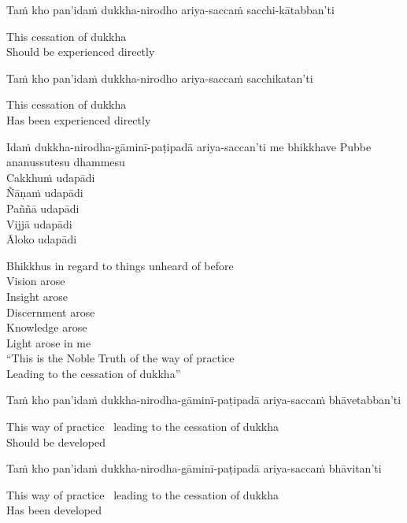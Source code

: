 Taṁ kho pan’idaṁ dukkha-nirodho ariya-saccaṁ sacchi-kātabban’ti

\begin{english}
  This cessation of dukkha\\
  Should be experienced directly
\end{english}

Taṁ kho pan’idaṁ dukkha-nirodho ariya-saccaṁ sacchikatan’ti

\begin{english}
  This cessation of dukkha\\
  Has been experienced directly
\end{english}

Idaṁ dukkha-nirodha-gāminī-paṭipadā ariya-saccan’ti me bhikkhave
Pubbe ananussutesu dhammesu\\
Cakkhuṁ udapādi\\
Ñāṇaṁ udapādi\\
Paññā udapādi\\
Vijjā udapādi\\
Āloko udapādi

\begin{english}
  Bhikkhus in regard to things unheard of before\\
  Vision arose\\
  Insight arose\\
  Discernment arose\\
  Knowledge arose\\
  Light arose in me\\
  “This is the Noble Truth of the way of practice\\
  Leading to the cessation of dukkha”
\end{english}

Taṁ kho pan’idaṁ dukkha-nirodha-gāminī-paṭipadā ariya-saccaṁ bhāvetabban’ti

\begin{english}
  This way of practice \breathmark\ leading to the cessation of dukkha\\
  Should be developed
\end{english}

Taṁ kho pan’idaṁ dukkha-nirodha-gāminī-paṭipadā ariya-saccaṁ bhāvitan’ti

\begin{english}
  This way of practice \breathmark\ leading to the cessation of dukkha\\
  Has been developed
\end{english}

